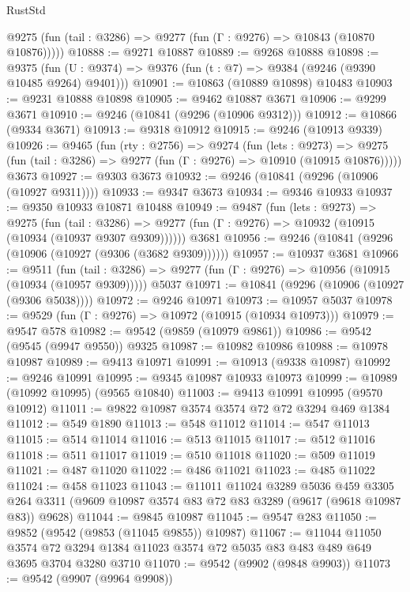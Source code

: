 \begin{lexlean}{RustStd}
\begin{coremodule}
      @9275 (fun (tail : @3286) => @9277 (fun (Γ : @9276) => @10843 (@10870 @10876)))))
@10888 := @9271 @10887
@10889 := @9268 @10888
@10898 := @9375
    (fun (U : @9374) => @9376 (fun (t : @7) => @9384 (@9246 (@9390 @10485 @9264) @9401)))
@10901 := @10863 (@10889 @10898) @10483
@10903 := @9231 @10888 @10898
@10905 := @9462 @10887 @3671
@10906 := @9299 @3671
@10910 := @9246 (@10841 (@9296 (@10906 @9312)))
@10912 := @10866 (@9334 @3671)
@10913 := @9318 @10912
@10915 := @9246 (@10913 @9339)
@10926 := @9465
    (fun (rty : @2756) =>
    @9274
      (fun (lets : @9273) =>
      @9275 (fun (tail : @3286) => @9277 (fun (Γ : @9276) => @10910 (@10915 @10876)))))
    @3673
@10927 := @9303 @3673
@10932 := @9246 (@10841 (@9296 (@10906 (@10927 @9311))))
@10933 := @9347 @3673
@10934 := @9346 @10933
@10937 := @9350 @10933 @10871 @10488
@10949 := @9487
    (fun (lets : @9273) =>
    @9275
      (fun (tail : @3286) =>
      @9277 (fun (Γ : @9276) => @10932 (@10915 (@10934 (@10937 @9307 @9309))))))
    @3681
@10956 := @9246 (@10841 (@9296 (@10906 (@10927 (@9306 (@3682 @9309))))))
@10957 := @10937 @3681
@10966 := @9511
    (fun (tail : @3286) => @9277 (fun (Γ : @9276) => @10956 (@10915 (@10934 (@10957 @9309)))))
    @5037
@10971 := @10841 (@9296 (@10906 (@10927 (@9306 @5038))))
@10972 := @9246 @10971
@10973 := @10957 @5037
@10978 := @9529 (fun (Γ : @9276) => @10972 (@10915 (@10934 @10973)))
@10979 := @9547 @578
@10982 := @9542 (@9859 (@10979 @9861))
@10986 := @9542 (@9545 (@9947 @9550)) @9325
@10987 := @10982 @10986
@10988 := @10978 @10987
@10989 := @9413 @10971
@10991 := @10913 (@9338 @10987)
@10992 := @9246 @10991
@10995 := @9345 @10987 @10933 @10973
@10999 := @10989 (@10992 @10995) (@9565 @10840)
@11003 := @9413 @10991 @10995 (@9570 @10912)
@11011 := @9822 @10987 @3574 @3574 @72 @72 @3294 @469 @1384
@11012 := @549 @1890
@11013 := @548 @11012
@11014 := @547 @11013
@11015 := @514 @11014
@11016 := @513 @11015
@11017 := @512 @11016
@11018 := @511 @11017
@11019 := @510 @11018
@11020 := @509 @11019
@11021 := @487 @11020
@11022 := @486 @11021
@11023 := @485 @11022
@11024 := @458 @11023
@11043 := @11011
    @11024
    @3289
    @5036
    @459
    @3305
    @264
    @3311
    (@9609 @10987 @3574 @83 @72 @83 @3289 (@9617 (@9618 @10987 @83)) @9628)
@11044 := @9845 @10987
@11045 := @9547 @283
@11050 := @9852 (@9542 (@9853 (@11045 @9855)) @10987)
@11067 := @11044
    @11050
    @3574
    @72
    @3294
    @1384
    @11023
    @3574
    @72
    @5035
    @83
    @483
    @489
    @649
    @3695
    @3704
    @3280
    @3710
@11070 := @9542 (@9902 (@9848 @9903))
@11073 := @9542 (@9907 (@9964 @9908))

\end{coremodule}
\end{lexlean}
